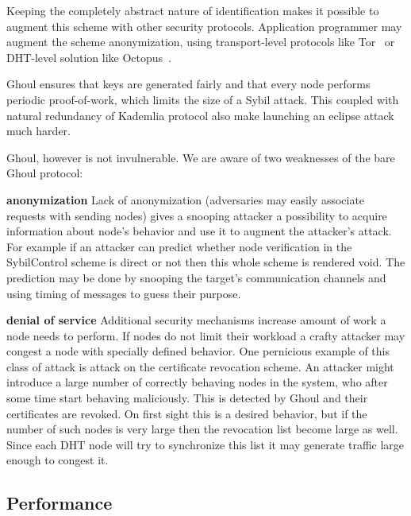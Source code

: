   Keeping the completely abstract nature of identification makes it possible to
  augment this scheme with other security protocols. Application programmer may
  augment the scheme anonymization, using transport-level protocols like 
  Tor~\cite{syv04} or DHT-level solution like Octopus~\cite{wan12b}.

  Ghoul ensures that keys are generated fairly and that every node performs
  periodic proof-of-work, which limits the size of a Sybil attack. This coupled
  with natural redundancy of Kademlia protocol also make launching an eclipse
  attack much harder.

  Ghoul, however is not invulnerable.
  We are aware of two weaknesses of the bare Ghoul protocol:

  \begin{description}
    \item{\textbf{anonymization}} Lack of anonymization (adversaries may easily
      associate requests with sending nodes) gives a snooping attacker a
      possibility to acquire information about node's behavior and use it to
      augment the attacker's attack.
      For example if an attacker can predict whether node verification in the
      SybilControl scheme is direct or not then this whole scheme is rendered
      void.
      The prediction may be done by snooping the target's communication
      channels and using timing of messages to guess their purpose.
    \item{\textbf{denial of service}} Additional security mechanisms increase
      amount of work a node needs to perform.
      If nodes do not limit their workload a crafty attacker may congest a node
      with specially defined behavior.
      One pernicious example of this class of attack is attack on the
      certificate revocation scheme.
      An attacker might introduce a large number of correctly
      behaving nodes in the system, who after some time start behaving
      maliciously. This is detected by Ghoul and their certificates are
      revoked.
      On first sight this is a desired behavior, but if the number of such nodes
      is very large then the revocation list become large as well.
      Since each DHT node will try to synchronize this list it may generate
      traffic large enough to congest it.
  \end{description}

  \subsection{Performance}


